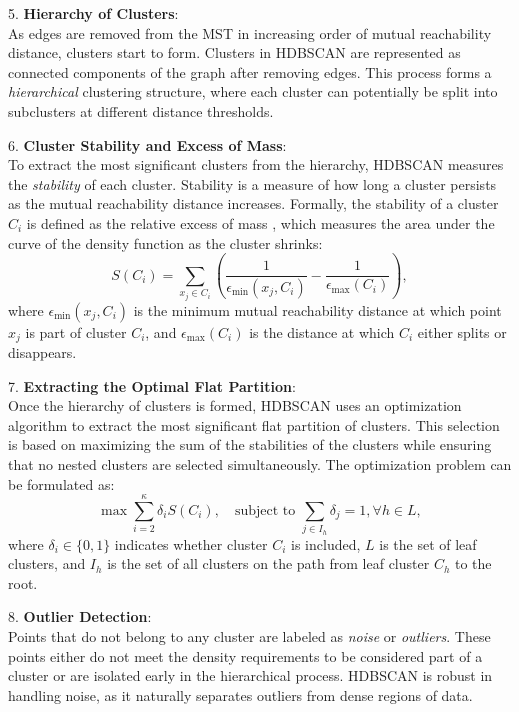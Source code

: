 5. \textbf{Hierarchy of Clusters}: \\
As edges are removed from the MST in increasing order of mutual reachability distance, clusters start to form. Clusters in HDBSCAN are represented as connected components of the graph after removing edges. This process forms a \textit{hierarchical} clustering structure, where each cluster can potentially be split into subclusters at different distance thresholds.

6. \textbf{Cluster Stability and Excess of Mass}: \\
To extract the most significant clusters from the hierarchy, HDBSCAN measures the \textit{stability} of each cluster. Stability is a measure of how long a cluster persists as the mutual reachability distance increases. Formally, the stability of a cluster $C_i$ is defined as the relative excess of mass \cite{campello_density-based_2013}, which measures the area under the curve of the density function as the cluster shrinks:
\[
    S(C_i) = \sum_{x_j \in C_i} \left( \frac{1}{\epsilon_{\text{min}}(x_j, C_i)} - \frac{1}{\epsilon_{\text{max}}(C_i)} \right),
\]
where $\epsilon_{\text{min}}(x_j, C_i)$ is the minimum mutual reachability distance at which point $x_j$ is part of cluster $C_i$, and $\epsilon_{\text{max}}(C_i)$ is the distance at which $C_i$ either splits or disappears.

7. \textbf{Extracting the Optimal Flat Partition}: \\
Once the hierarchy of clusters is formed, HDBSCAN uses an optimization algorithm to extract the most significant flat partition of clusters. This selection is based on maximizing the sum of the stabilities of the clusters while ensuring that no nested clusters are selected simultaneously. The optimization problem can be formulated as:
\[
    \max \sum_{i=2}^{\kappa} \delta_i S(C_i), \quad \text{subject to } \sum_{j \in I_h} \delta_j = 1, \forall h \in L,
\]
where $\delta_i \in \{0, 1\}$ indicates whether cluster $C_i$ is included, $L$ is the set of leaf clusters, and $I_h$ is the set of all clusters on the path from leaf cluster $C_h$ to the root.

8. \textbf{Outlier Detection}: \\
Points that do not belong to any cluster are labeled as \textit{noise} or \textit{outliers}. These points either do not meet the density requirements to be considered part of a cluster or are isolated early in the hierarchical process. HDBSCAN is robust in handling noise, as it naturally separates outliers from dense regions of data.

